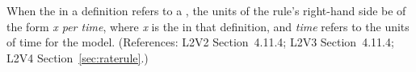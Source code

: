 When the  in a \RateRule definition refers to a \Parameter,
the units of the rule's right-hand side  be of the form \emph{x per
time}, where \emph{x} is the  in that \Parameter definition,
and \emph{time} refers to the units of time for the model.  (References:
L2V2 Section~4.11.4; L2V3 Section~4.11.4; L2V4 Section~\ref{sec:raterule}.)
